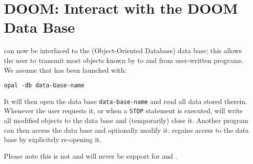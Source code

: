 \section{DOOM: Interact with the DOOM Data Base}
\label{sec:doom}
\opal can now be interfaced to the 
(\opal Object-Oriented Database)
data base; this allows the user to transmit most objects known by \opal
to and from user-written programs.
We assume that \opal has been launched with:
\begin{verbatim}
opal -db data-base-name
\end{verbatim}
It will then open the data base \texttt{data-base-name} and read all
data stored therein.
Whenever the user requests it, or when a \texttt{STOP} statement is 
executed, \opal will write all modified objects to the data base and
(temporarily) close it.
Another program can then access the data base and optionally modify it.
\opal regains access to the data base by explicitely re-opening it.

Please note this is not and will never be support for \noopalt and \noopalcycl .

